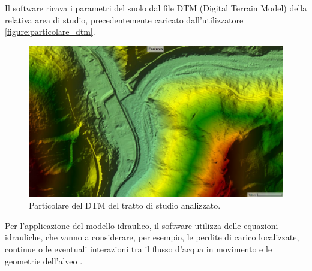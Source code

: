 Il software ricava i parametri del suolo dal file DTM (Digital Terrain Model) della relativa area di studio, precedentemente caricato dall'utilizzatore \eqref{figure:particolare_dtm}.

\begin{figure}[H] \centering
    \includegraphics[scale=0.3]{immagini/particolare_dtm.JPG}
    \caption{Particolare del DTM del tratto di studio analizzato.}
    \label{figure:particolare_dtm}
    \end{figure}

Per l'applicazione del modello idraulico, il software utilizza delle equazioni idrauliche, che vanno a considerare, per esempio, le perdite di carico localizzate, continue o le eventuali interazioni tra il flusso d'acqua in movimento e le geometrie dell'alveo \cite{hydraulic_equations}.

